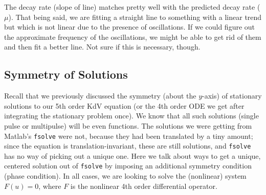 \documentclass[12pt]{article}
\begin{document}
The decay rate (slope of line) matches pretty well with the predicted decay rate ($\mu$). That being said, we are fitting a straight line to something with a linear trend but which is not linear due to the presence of oscillations. If we could figure out the approximate frequency of the oscillations, we might be able to get rid of them and then fit a better line. Not sure if this is necessary, though.


\subsection*{Symmetry of Solutions}
Recall that we previously discussed the symmetry (about the $y$-axis) of stationary solutions to our 5th order KdV equation (or the 4th order ODE we get after integrating the stationary problem once). We know that all such solutions (single pulse or multipulse) will be even functions. The solutions we were getting from Matlab's \texttt{fsolve} were not, because they had been translated by a tiny amount; since the equation is translation-invariant, these are still solutions, and \texttt{fsolve} has no way of picking out a unique one. Here we talk about ways to get a unique, centered solution out of \texttt{fsolve} by imposing an additional symmetry condition (phase condition). In all cases, we are looking to solve the (nonlinear) system $F(u) = 0$, where $F$ is the nonlinear 4th order differential operator.
\end{document}
